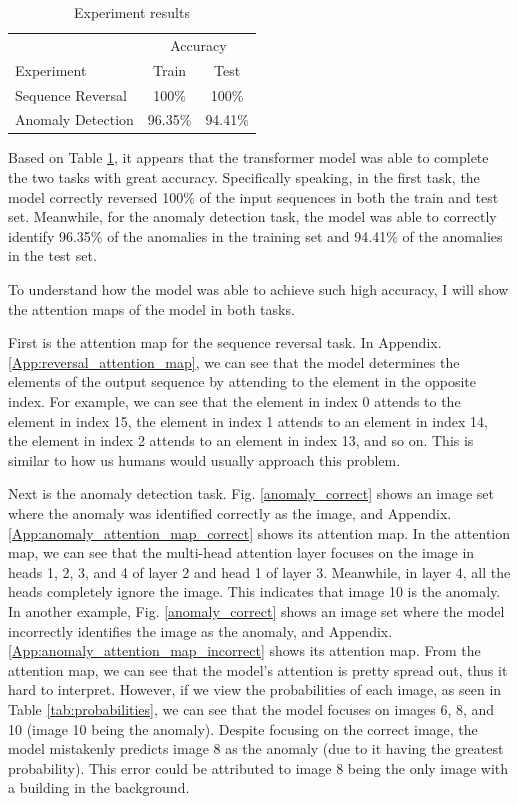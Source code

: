 \documentclass[peerreview]{IEEEtran}
\begin{document}
\begin{table}[h] 
\centering 
\begin{tabular}{l c c}
\toprule 
& \multicolumn{2}{c}{Accuracy} \\ 
\cmidrule(l){2-3} 
Experiment & Train & Test\\ 
\midrule
Sequence Reversal & 100\% & 100\%\\
Anomaly Detection & 96.35\% & 94.41\%\\ 
\bottomrule
\end{tabular}
\smallskip 
\caption{Experiment results} 
\label{tab:experiment results}
\end{table}

Based on Table \ref{tab:experiment results}, it appears that the transformer model was able to complete the two tasks with great accuracy. Specifically speaking, in the first task, the model correctly reversed 100\% of the input sequences in both the train and test set. Meanwhile, for the anomaly detection task, the model was able to correctly identify 96.35\% of the anomalies in the training set and  94.41\% of the anomalies in the test set.

To understand how the model was able to achieve such high accuracy, I will show the attention maps of the model in both tasks.

First is the attention map for the sequence reversal task. In Appendix. \ref{App:reversal_attention_map}, we can see that the model determines the elements of the output sequence by attending to the element in the opposite index. For example, we can see that the element in index 0 attends to the element in index 15, the element in index 1 attends to an element in index 14, the element in index 2 attends to an element in index 13, and so on. This is similar to how us humans would usually approach this problem.

Next is the anomaly detection task. Fig. \ref{anomaly_correct} shows an image set where the anomaly was identified correctly as the  image, and Appendix. \ref{App:anomaly_attention_map_correct} shows its attention map. In the attention map, we can see that the multi-head attention layer focuses on the  image in heads 1, 2, 3, and 4 of layer 2 and head 1 of layer 3. Meanwhile, in layer 4, all the heads completely ignore the  image. This indicates that image 10 is the anomaly. In another example, Fig. \ref{anomaly_correct} shows an image set where the model incorrectly identifies the  image as the anomaly, and Appendix. \ref{App:anomaly_attention_map_incorrect} shows its attention map. From the attention map, we can see that the model's attention is pretty spread out, thus it hard to interpret. However, if we view the probabilities of each image, as seen in Table \ref{tab:probabilities}, we can see that the model focuses on images 6, 8, and 10 (image 10 being the anomaly). Despite focusing on the correct image, the model mistakenly predicts image 8 as the anomaly (due to it having the greatest probability). This error could be attributed to image 8 being the only image with a building in the background.
\end{document}
